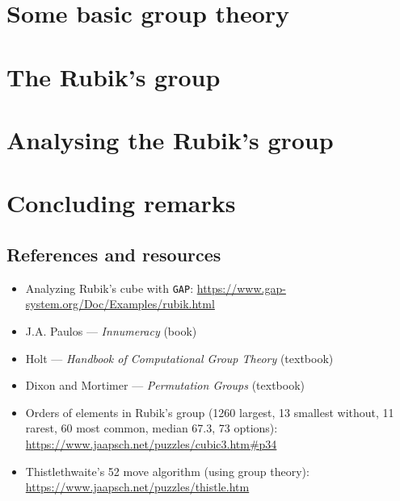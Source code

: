 \documentclass{beamer}
\begin{document}
\section{Some basic group theory}



\section{The Rubik's group}



\section{Analysing the Rubik's group}



\section{Concluding remarks}

\subsection{References and resources}

\begin{slide}
    \begin{itemize}
        \item Analyzing Rubik's cube with \texttt{GAP}: \url{https://www.gap-system.org/Doc/Examples/rubik.html}
        \item J.A. Paulos --- \textit{Innumeracy} (book)
        \item Holt --- \textit{Handbook of Computational Group Theory} (textbook)
        \item Dixon and Mortimer --- \textit{Permutation Groups} (textbook)
        \item Orders of elements in Rubik's group (1260 largest, 13 smallest without, 11 rarest, 60 most common, median 67.3, 73 options): \url{https://www.jaapsch.net/puzzles/cubic3.htm\#p34}
        \item Thistlethwaite's 52 move algorithm (using group theory): \url{https://www.jaapsch.net/puzzles/thistle.htm}
    \end{itemize}
\end{slide}


\end{document}
